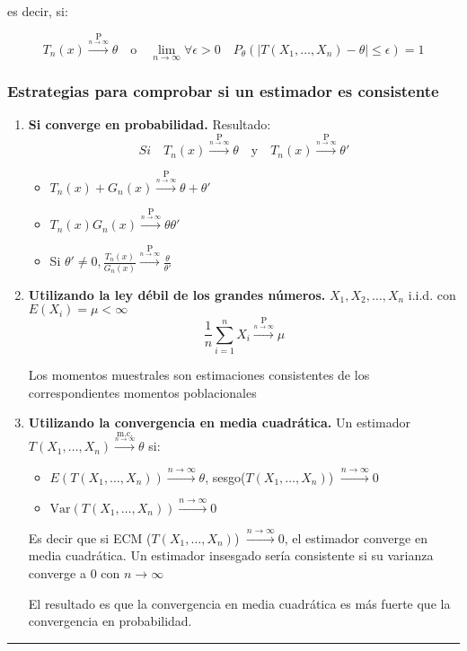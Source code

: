 es decir, si:

\[
    T_n(x) \xrightarrow{\underset{n \to \infty}{\text{P}}} \theta \quad \text{o} \quad \lim_{n \to \infty} \forall \epsilon > 0 \quad P_\theta\left(|T(X_1, \dots, X_n) - \theta| \leq \epsilon\right) = 1
\]

\newpage
\subsubsection*{Estrategias para comprobar si un estimador es consistente}

\begin{enumerate}
    \setlength{\parskip}{1em}
    \item \textbf{Si converge en probabilidad.}
          Resultado:
          \[
              Si \quad T_n(x) \xrightarrow{\underset{n \to \infty}{\text{P}}} \theta \quad \text{y} \quad T_n(x) \xrightarrow{\underset{n \to \infty}{\text{P}}} \theta'
          \]
          \begin{itemize}
              \item \(T_n(x)+G_n(x) \xrightarrow{\underset{n \to \infty}{\text{P}}} \theta + \theta '\)
              \item \(T_n(x)G_n(x) \xrightarrow{\underset{n \to \infty}{\text{P}}} \theta\theta '\)
              \item Si \(\theta' \neq 0, \frac{T_n(x)}{G_n(x)} \xrightarrow{\underset{n \to \infty}{\text{P}}} \frac{\theta}{\theta '}\)
          \end{itemize}

    \item \textbf{Utilizando la ley débil de los grandes números.}
          \(X_1, X_2, \dots, X_n\) i.i.d. con \(E(X_i)=\mu < \infty\)
          \setlength{\parskip}{0em}
          \[\frac{1}{n}\sum_{i=1}^{n} X_i \xrightarrow{\underset{n \to \infty}{\text{P}}} \mu\]

          \setlength{\parskip}{1em}
          Los momentos muestrales son estimaciones consistentes de los correspondientes momentos poblacionales

    \item \textbf{Utilizando la convergencia en media cuadrática.}
          Un estimador $T(X_1, \dots, X_n)\xrightarrow{\underset{n \to \infty}{\text{m.c.}}} \theta$ si:
          \begin{itemize}
              \item \(E(T(X_1, \dots, X_n)) \xrightarrow{{n \to \infty}} \theta\), sesgo(\(T(X_1, \dots, X_n)\)) \(\xrightarrow{{n \to \infty}} 0\)
              \item \(\text{Var}(T(X_1, \dots, X_n)) \xrightarrow{{n \to \infty}} 0\)
          \end{itemize}
          Es decir que si ECM ($T(X_1, \dots, X_n)$) \(\xrightarrow{{n \to \infty}} 0\), el estimador converge en media cuadrática. Un estimador insesgado sería consistente si su varianza converge a 0 con \(n \to \infty\)

          El resultado es que la convergencia en media cuadrática es más fuerte que la convergencia en probabilidad.
\end{enumerate}
\noindent\rule{\textwidth}{0.2pt} %

